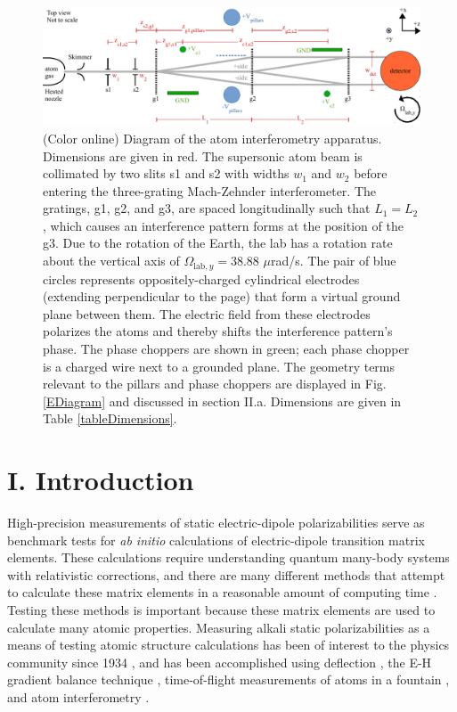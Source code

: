 \documentclass[twocolumn,prl,showpacs,superscriptaddress]{revtex4-1}   %
\newcommand{\figref}[1]{Fig. \ref{#1}}
\newcommand{\Omegalab}{\Omega_{\mathrm{lab},y}}
\begin{document}
\begin{figure}
\includegraphics[width=\linewidth,keepaspectratio]{IFM_diagram1.pdf}
\caption{\label{IFMDiagram}(Color online) Diagram of the atom interferometry apparatus. Dimensions are given in red.  The supersonic atom beam is collimated by two slits s1 and s2 with widths $w_1$ and $w_2$ before entering the three-grating Mach-Zehnder interferometer. 
The gratings, g1, g2, and g3, are spaced longitudinally such that $L_1 = L_2$, which causes an interference pattern forms at the position of the g3.
Due to the rotation of the Earth, the lab has a rotation rate about the vertical axis of $\Omegalab = 38.88$ $\mu$rad/s. 
The pair of blue circles represents oppositely-charged cylindrical electrodes (extending perpendicular to the page) that form a virtual ground plane between them. The electric field from these electrodes polarizes the atoms and thereby shifts the interference pattern's phase. 
The phase choppers are shown in green; each phase chopper is a charged wire next to a grounded plane. The geometry terms relevant to the pillars and phase choppers are displayed in \figref{EDiagram} and discussed in section II.a. Dimensions are given in Table \ref{tableDimensions}.}
\end{figure}

\section{I. Introduction}

High-precision measurements of static electric-dipole polarizabilities serve as benchmark tests for \textit{ab initio} calculations of electric-dipole transition matrix elements. 
These calculations require understanding quantum many-body systems with relativistic corrections, and there are many different methods that attempt to calculate these matrix elements in a reasonable amount of computing time \cite{Mitroy2010}. Testing these methods is important because these matrix elements are used to calculate many atomic properties.
Measuring alkali static polarizabilities as a means of testing atomic 
structure calculations has been of interest to the physics community since
1934 \cite{Scheffers1934}, and has been
accomplished using deflection \cite{Scheffers1934,Chamberlain1963,Hall1974,Ma2015}, the E-H gradient
balance technique \cite{Salop1961,Molof1974a}, time-of-flight measurements of atoms in a fountain \cite{Amini2003},  and atom interferometry 
\cite{Ekstrom1995,Miffre2006,Holmgren2010}.
\end{document}
